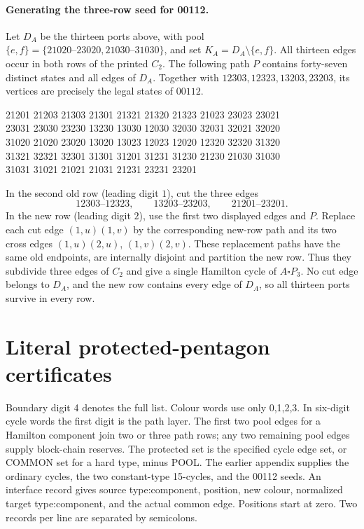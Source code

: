 \documentclass[11pt]{article}
\theoremstyle{remark}
\numberwithin{equation}{section}
\numberwithin{table}{section}
\begin{document}
\paragraph{Generating the three-row seed for 00112.}
Let $D_A$ be the thirteen ports above, with pool
$\{e,f\}=\{21020\text{--}23020,21030\text{--}31030\}$, and set
$K_A=D_A\setminus\{e,f\}$. All thirteen edges occur in both rows
of the printed $C_2$.
The following path $P$ contains forty-seven distinct states and
all edges of $D_A$. Together with $12303,12323,13203,23203$,
its vertices are precisely the legal states of $00112$.
\begingroup\small\ttfamily\begin{flushleft}
21201 21203 21303 21301 21321 21320 21323 21023 23023 23021\\
23031 23030 23230 13230 13030 12030 32030 32031 32021 32020\\
31020 21020 23020 13020 13023 12023 12020 12320 32320 31320\\
31321 32321 32301 31301 31201 31231 31230 21230 21030 31030\\
31031 31021 21021 21031 21231 23231 23201
\end{flushleft}\endgroup
In the second old row (leading digit $1$), cut the three edges
\[
12303\text{--}12323,\qquad13203\text{--}23203,\qquad
21201\text{--}23201.
\]
In the new row (leading digit $2$), use the first two displayed
edges and $P$. Replace each cut edge $(1,u)(1,v)$ by the corresponding
new-row path and its two cross edges $(1,u)(2,u)$, $(1,v)(2,v)$.
These replacement paths have the same old endpoints, are internally
disjoint and partition the new row. Thus they subdivide three edges
of $C_2$ and give a single Hamilton cycle of $A\square P_3$.
No cut edge belongs to $D_A$, and the new row contains every edge
of $D_A$, so all thirteen ports survive in every row.


\section{Literal protected-pentagon certificates}
\label{app:protected-pentagon-words}
Boundary digit 4 denotes the full list. Colour words use only 0,1,2,3.
In six-digit cycle words the first digit is the path layer.
The first two pool edges for a Hamilton component join two or three
path rows; any two remaining pool edges supply block-chain reserves.
The protected set is the specified cycle edge set, or COMMON set
for a hard type, minus POOL. The earlier appendix supplies the
ordinary cycles, the two constant-type 15-cycles, and the 00112 seeds.
An interface record gives source type:component, position, new colour,
normalized target type:component, and the actual common edge.
Positions start at zero. Two records per line are separated by semicolons.
\end{document}
